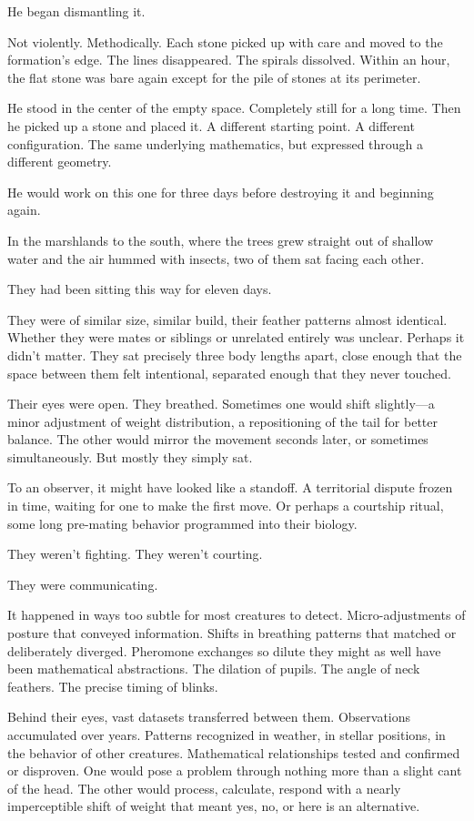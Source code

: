 He began dismantling it.

Not violently. Methodically. Each stone picked up with care and moved to the formation's edge. The lines disappeared. The spirals dissolved. Within an hour, the flat stone was bare again except for the pile of stones at its perimeter.

He stood in the center of the empty space. Completely still for a long time. Then he picked up a stone and placed it. A different starting point. A different configuration. The same underlying mathematics, but expressed through a different geometry.

He would work on this one for three days before destroying it and beginning again.

\scenebreak

In the marshlands to the south, where the trees grew straight out of shallow water and the air hummed with insects, two of them sat facing each other.

They had been sitting this way for eleven days.

They were of similar size, similar build, their feather patterns almost identical. Whether they were mates or siblings or unrelated entirely was unclear. Perhaps it didn't matter. They sat precisely three body lengths apart, close enough that the space between them felt intentional, separated enough that they never touched.

Their eyes were open. They breathed. Sometimes one would shift slightly—a minor adjustment of weight distribution, a repositioning of the tail for better balance. The other would mirror the movement seconds later, or sometimes simultaneously. But mostly they simply sat.

To an observer, it might have looked like a standoff. A territorial dispute frozen in time, waiting for one to make the first move. Or perhaps a courtship ritual, some long pre-mating behavior programmed into their biology.

They weren't fighting. They weren't courting.

They were communicating.

It happened in ways too subtle for most creatures to detect. Micro-adjustments of posture that conveyed information. Shifts in breathing patterns that matched or deliberately diverged. Pheromone exchanges so dilute they might as well have been mathematical abstractions. The dilation of pupils. The angle of neck feathers. The precise timing of blinks.

Behind their eyes, vast datasets transferred between them. Observations accumulated over years. Patterns recognized in weather, in stellar positions, in the behavior of other creatures. Mathematical relationships tested and confirmed or disproven. One would pose a problem through nothing more than a slight cant of the head. The other would process, calculate, respond with a nearly imperceptible shift of weight that meant yes, no, or here is an alternative.

